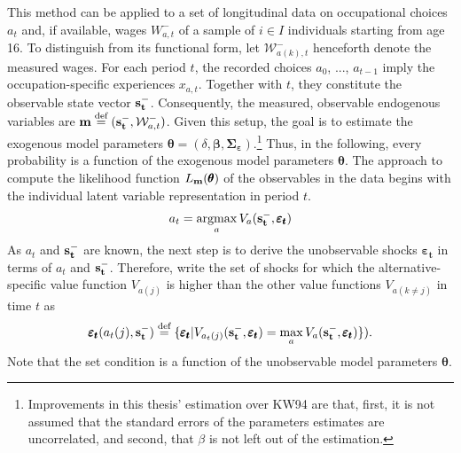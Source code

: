 This method can be applied to a set of longitudinal data on occupational choices $a_t$ and, if available, wages $W_{a,t}^{-}$ of a sample of $i \in I$ individuals starting from age 16. To distinguish from its functional form, let $\mathcal{W}^{-}_{a(k),t}$ henceforth denote the measured wages. For each period $t$, the recorded choices $a_0$, ..., $a_{t-1}$  imply the occupation-specific experiences $x_{a,t}$. Together with $t$, they constitute the observable state vector $\bold{s_t^-}$. Consequently, the measured, observable endogenous variables are $\bold{m}\stackrel{\text{def}}{=}(\bold{s_t^-},\mathcal{W}^{-}_{a,t})$. Given this setup, the goal is to estimate the exogenous model parameters $\pmb{\theta}=(\delta, \pmb{\beta}, \pmb{\Sigma_\varepsilon})$.\footnote{Improvements in this thesis' estimation over KW94 are that, first, it is not assumed that the standard errors of the parameters estimates are uncorrelated, and second, that $\beta$ is not left out of the estimation.} Thus, in the following, every probability is a function of the exogenous model parameters $\pmb{\theta}$.
The approach to compute the likelihood function $L_{\bold{m}}(\pmb{\theta})$ of the observables in the data begins with the individual latent variable representation in period $t$.
\begin{align}
a_t = \operatorname*{argmax}_a V_a(\bold{s_t^-},\pmb{\varepsilon_t})
\end{align}
As $a_t$ and $\bold{s_t^-}$ are known, the next step is to derive the unobservable shocks $\pmb{\varepsilon_t}$ in terms of $a_t$ and $\bold{s_t^-}$. Therefore, write the set of shocks for which the alternative-specific value function $V_{a(j)}$ is higher than the other value functions $V_{a(k\neq j)}$ in time $t$ as
\begin{align}
\pmb{\varepsilon_t}(a_t(j),\bold{s_t^-}) \stackrel{\text{def}}{=} \{\pmb{\varepsilon_t}|V_{a_t(j)}(\bold{s_t^-},\pmb{\varepsilon_t}) = \max_a V_a(\bold{s_t^-},\pmb{\varepsilon_t})\}).
\end{align}
Note that the set condition is a function of the unobservable model parameters $\pmb{\theta}$.

